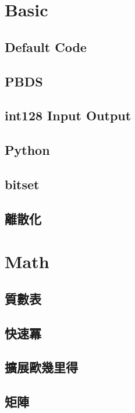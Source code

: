 \section{Basic}
\subsection{Default Code}

\subsection{PBDS}

\subsection{int128 Input Output}

\subsection{Python}

\subsection{bitset}

\subsection{離散化}


\section{Math}
\subsection{質數表} 

\subsection{快速冪} 

\subsection{擴展歐幾里得} 

\subsection{矩陣} 

